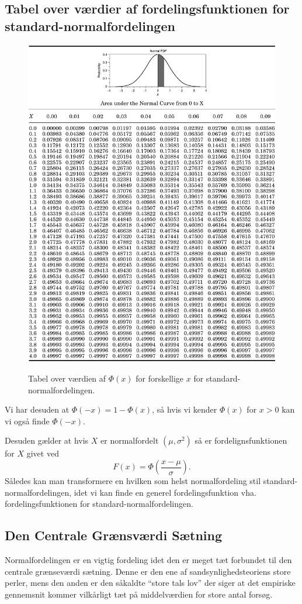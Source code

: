 \subsection{Tabel over værdier af fordelingsfunktionen for standard-normalfordelingen}
\begin{figure} [ht]
  \centering
  \caption{Tabel over værdien af $\Phi(x)$ for forskellige $x$ for standard-normalfordelingen.}
  \includegraphics[width=0.8\linewidth]{./figures/F13_1.png}
  \label{fig:F13_1}
\end{figure}
Vi har desuden at $\Phi(-x) = 1 - \Phi(x)$, så hvis vi kender $\Phi(x)$ for $x > 0$ kan vi også finde $\Phi(-x)$.

Desuden gælder at hvis $X$ er normalfordelt $(\mu, \sigma^2)$ så er fordelignsfunktionen for $X$ givet ved
\[ 
F(x) = \Phi \left( \frac{x - \mu}{\sigma} \right)
.\]
Således kan man transformere en hvilken som helst normalfordeling stil standard-normalfordelingen, idet vi kan finde en generel fordelingsfunktion vha. fordelingsfunktionen for standard-normalfordelingen.

\clearpage


\subsection{Den Centrale Grænsværdi Sætning}
Normalfordelingen er en vigtig fordeling idet den er meget tæt forbundet til den centrale grænseværdi sætning. Denne er den ene af sandsynlighedsteoriens store perler, mens den anden er den såkaldte ``store tals lov'' der siger at det empiriske gennemsnit kommer vilkårligt tæt på middelværdien for store antal forsøg.

